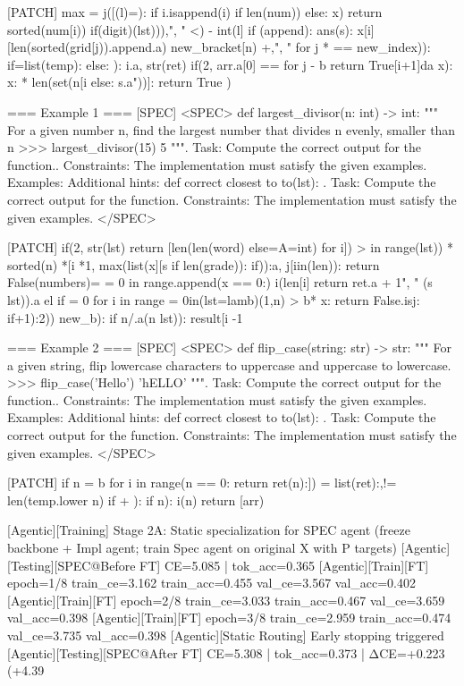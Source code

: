 [PATCH]
max = j([(l)=): if i.isappend(i) if len(num)) else: x) return sorted(num[i)) if(digit)(lst))),", " <) - int(l] if (append): ans(s): x[i][len(sorted(grid[j)).append.a) new_bracket[n) +,", " for j * == new_index)): if=list(temp): else: ): i.a, str(ret) if(2, arr.a[0] == for j - b return True[i+1]da x): x:  * len(set(n[i else: s.a"))]: return True )

=== Example 1 ===
[SPEC]
<SPEC> def largest_divisor(n: int) -> int: """ For a given number n, find the largest number that divides n evenly, smaller than n >>> largest_divisor(15) 5 """. Task: Compute the correct output for the function.. Constraints: The implementation must satisfy the given examples. Examples: Additional hints: def correct closest to to(lst): . Task: Compute the correct output for the function. Constraints: The implementation must satisfy the given examples. </SPEC>

[PATCH]
if(2, str(lst) return [len(len(word) else=A=int) for i]) > in range(lst)) * sorted(n) *[i *1, max(list(x][s if len(grade)): if)):a, j[iin(len)): return False(numbers)= = 0 in range.append(x == 0:) i(len[i] return ret.a + 1", " (s lst)).a el if = 0 for i in range = 0in(lst=lamb)(1,n) > b* x: return False.isj: if+1):2)) new_b): if n/.a(n lst)):  result[i -1

=== Example 2 ===
[SPEC]
<SPEC> def flip_case(string: str) -> str: """ For a given string, flip lowercase characters to uppercase and uppercase to lowercase. >>> flip_case('Hello') 'hELLO' """. Task: Compute the correct output for the function.. Constraints: The implementation must satisfy the given examples. Examples: Additional hints: def correct closest to to(lst): . Task: Compute the correct output for the function. Constraints: The implementation must satisfy the given examples. </SPEC>

[PATCH]
if n = b for i in range(n == 0:  return ret(n):]) = list(ret):,!= len(temp.lower n) if + ): if n): i(n) return [arr) %

[Agentic][Training] Stage 2A: Static specialization for SPEC agent (freeze backbone + Impl agent; train Spec agent on original X with P targets)
[Agentic][Testing][SPEC@Before FT] CE=5.085 | tok_acc=0.365
[Agentic][Train][FT] epoch=1/8 train_ce=3.162 train_acc=0.455 val_ce=3.567 val_acc=0.402
[Agentic][Train][FT] epoch=2/8 train_ce=3.033 train_acc=0.467 val_ce=3.659 val_acc=0.398
[Agentic][Train][FT] epoch=3/8 train_ce=2.959 train_acc=0.474 val_ce=3.735 val_acc=0.398
[Agentic][Static Routing] Early stopping triggered
[Agentic][Testing][SPEC@After FT] CE=5.308 | tok_acc=0.373 | ΔCE=+0.223 (+4.39%

